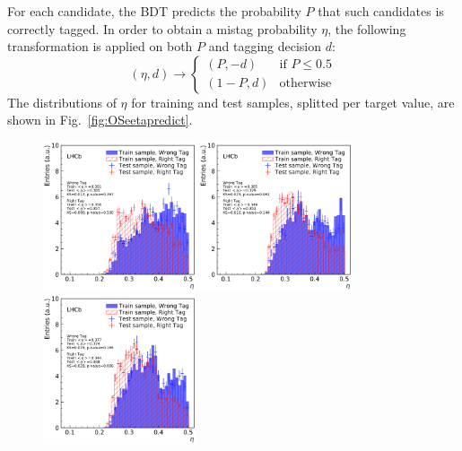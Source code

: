 For each candidate, the BDT predicts the probability $P$ that such candidates is correctly tagged. In order to obtain a mistag probability $\eta$, the following transformation is applied on both $P$ and tagging decision $d$:
\begin{equation}
        (\eta, d) \rightarrow \begin{cases} (P, -d) &\text{if $P\leq0.5$} \\ (1-P, d) &\text{otherwise} \end{cases}        
\end{equation} 
The distributions of $\eta$ for training and test samples, splitted per target value, are shown in Fig.~\ref{fig:OSeetapredict}.

\begin{figure}[t]
        \begin{center}
        \includegraphics[width=0.4\textwidth]{04Flavourtagging/figs/OSelectronOpt/2017-12-12-vibattis-OSElectron-bdt-calibration-sWeights_Run1/PredictedEta_RunIcuts.pdf}
        \includegraphics[width=0.4\textwidth]{04Flavourtagging/figs/OSelectronOpt/2017-12-12-vibattis-OSElectron-bdt-calibration-sWeights_Run2/PredictedEta_RunIIcuts.pdf}
        \includegraphics[width=0.4\textwidth]{04Flavourtagging/figs/OSelectronOpt/2018-04-07-vibattis-OSElectron-bdt-calibration-sWeights_Run2_Bu2D0pi/PredictedEta_RunIIcuts.pdf}

\end{center}
\end{figure}
